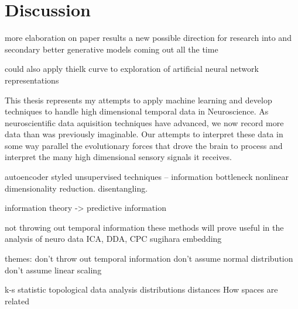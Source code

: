 \chapter{Discussion}
more elaboration on paper results
a new possible direction for research into \CP and secondary 
better generative models coming out all the time

could also apply thielk curve to exploration of artificial neural network representations 

This thesis represents my attempts to apply machine learning and develop techniques to handle high dimensional temporal data in Neuroscience. As neuroscientific data aquisition techniques have advanced, we now record more data than was previously imaginable. Our attempts to interpret these data in some way parallel the evolutionary forces that drove the brain to process and interpret the many high dimensional sensory signals it receives. 

autoencoder styled unsupervised techniques -- information bottleneck
nonlinear dimensionality reduction. disentangling.

information theory -> predictive information

not throwing out temporal information
these methods will prove useful in the analysis of neuro data
ICA, DDA, CPC
sugihara embedding

themes:
don't throw out temporal information
don't assume normal distribution
don't assume linear scaling

k-s statistic
topological data analysis
distributions
distances
How spaces are related